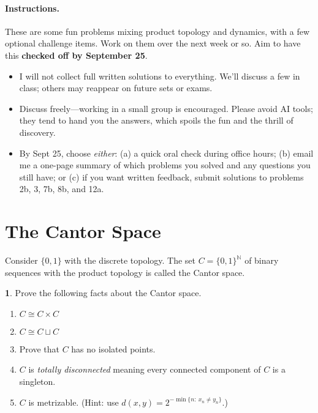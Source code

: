 \documentclass[11pt]{article}
\theoremstyle{definition}
\newtheorem{problem}{}
\newcommand{\bp}{\begin{problem}}
\newcommand{\ep}{\end{problem}\bigskip}
\theoremstyle{theorem}
\begin{document}
\pagestyle{fancy}
\fancyfoot[R,C,L]{}

\newcommand{\Top}{\mathbf{Top}}
\newcommand{\Set}{\mathbf{Set}}
\newcommand{\N}{\mathbb{N}}

\paragraph{Instructions.}
These are some fun problems mixing product topology and dynamics, with a few optional challenge items. Work on them over the next week or so.  Aim to have this \textbf{checked off by September 25}.

\begin{itemize}
\item I will not collect full written solutions to everything. We’ll discuss a few in class; others may reappear on future sets or exams.
\item Discuss freely—working in a small group is encouraged. Please avoid AI tools; they tend to hand you the answers, which spoils the fun and the thrill of discovery.
\item By Sept 25, choose \emph{either}: (a) a quick oral check during office hours; (b) email me a one-page summary of which problems you solved and any questions you still have; or (c) if you want written feedback, submit solutions to problems 2b, 3, 7b, 8b, and 12a.
\end{itemize}

\section*{The Cantor Space}

Consider $\{0,1\}$ with the discrete topology.  The set $C=\{0,1\}^\N$ of binary sequences with the product topology is called the Cantor space.

\bp Prove the following facts about the Cantor space.
\begin{enumerate}[label=(\alph*)]
\item $C\cong C\times C$
\item $C\cong C \sqcup C$
\item Prove that $C$ has no isolated points.
\item $C$ is \emph{totally disconnected} meaning every connected component of $C$ is a singleton.
\item $C$ is metrizable.  (Hint: use $d(x,y)=2^{-\min\{n:\ x_n\ne y_n\}}$.)
\end{enumerate}
\ep
\end{document}
